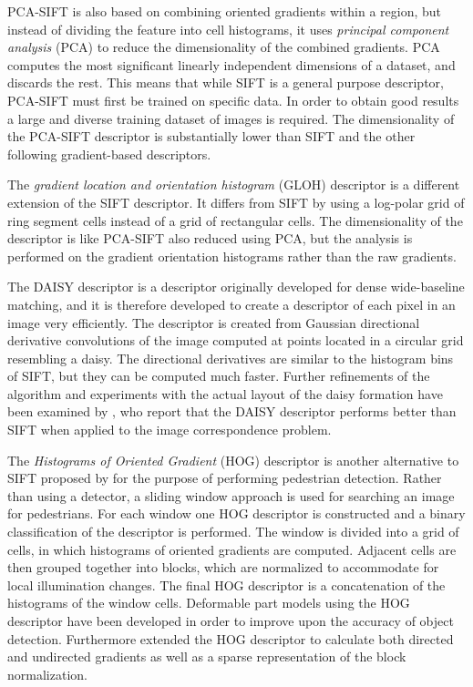 \documentclass[thesis.tex]{subfiles}
\begin{document}
PCA-SIFT \cite{ke2004pca} is also based on combining oriented gradients within a region, but instead of dividing the feature into cell histograms, it uses \emph{principal component analysis} (PCA) to reduce the dimensionality of the combined gradients. PCA computes the most significant linearly independent dimensions of a dataset, and discards the rest. This means that while SIFT is a general purpose descriptor, PCA-SIFT must first be trained on specific data. In order to obtain good results a large and diverse training dataset of images is required. The dimensionality of the PCA-SIFT descriptor is substantially lower than SIFT and the other following gradient-based descriptors.

The \emph{gradient location and orientation histogram} (GLOH) descriptor \cite{mikolajczyk2005performance} is a different extension of the SIFT descriptor. It differs from SIFT by using a log-polar grid of ring segment cells instead of a grid of rectangular cells. The dimensionality of the descriptor is like PCA-SIFT also reduced using PCA, but the analysis is performed on the gradient orientation histograms rather than the raw gradients.

The DAISY descriptor \cite{tola2008fast} is a descriptor originally developed for dense wide-baseline matching, and it is therefore developed to create a descriptor of each pixel in an image very efficiently. The descriptor is created from Gaussian directional derivative convolutions of the image computed at points located in a circular grid resembling a daisy. The directional derivatives are similar to the histogram bins of SIFT, but they can be computed much faster.  Further refinements of the algorithm and experiments with the actual layout of the daisy formation have been examined by \citet{winder2009picking}, who report that the DAISY descriptor performs better than SIFT when applied to the image correspondence problem.

The \emph{Histograms of Oriented Gradient} (HOG) descriptor is another alternative to SIFT proposed by \citet{dalal2005histograms} for the purpose of performing pedestrian detection. Rather than using a detector, a sliding window approach is used for searching an image for pedestrians. For each window one HOG descriptor is constructed and a binary classification of the descriptor is performed. The window is divided into a grid of cells, in which histograms of oriented gradients are computed. Adjacent cells are then grouped together into blocks, which are normalized to accommodate for local illumination changes. The final HOG descriptor is a concatenation of the histograms of the window cells. Deformable part models using the HOG descriptor have been developed \cite{felzenszwalb2008discriminatively} in order to improve upon the accuracy of object detection.  Furthermore \citet{felzenszwalb2009object} extended the HOG descriptor to calculate both directed and undirected gradients as well as a sparse representation of the block normalization.
\end{document}
